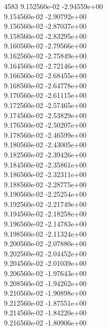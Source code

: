 4583	9.152560e-02	-2.94559e+00	\\ 	9.154560e-02	-2.90792e+00	\\ 	9.156560e-02	-2.87037e+00	\\ 	9.158560e-02	-2.83295e+00	\\ 	9.160560e-02	-2.79566e+00	\\ 	9.162560e-02	-2.75849e+00	\\ 	9.164560e-02	-2.72146e+00	\\ 	9.166560e-02	-2.68455e+00	\\ 	9.168560e-02	-2.64778e+00	\\ 	9.170560e-02	-2.61115e+00	\\ 	9.172560e-02	-2.57465e+00	\\ 	9.174560e-02	-2.53829e+00	\\ 	9.176560e-02	-2.50207e+00	\\ 	9.178560e-02	-2.46599e+00	\\ 	9.180560e-02	-2.43005e+00	\\ 	9.182560e-02	-2.39426e+00	\\ 	9.184560e-02	-2.35861e+00	\\ 	9.186560e-02	-2.32311e+00	\\ 	9.188560e-02	-2.28775e+00	\\ 	9.190560e-02	-2.25254e+00	\\ 	9.192560e-02	-2.21749e+00	\\ 	9.194560e-02	-2.18258e+00	\\ 	9.196560e-02	-2.14783e+00	\\ 	9.198560e-02	-2.11324e+00	\\ 	9.200560e-02	-2.07880e+00	\\ 	9.202560e-02	-2.04452e+00	\\ 	9.204560e-02	-2.01039e+00	\\ 	9.206560e-02	-1.97643e+00	\\ 	9.208560e-02	-1.94262e+00	\\ 	9.210560e-02	-1.90898e+00	\\ 	9.212560e-02	-1.87551e+00	\\ 	9.214560e-02	-1.84220e+00	\\ 	9.216560e-02	-1.80906e+00	\\ \hline
